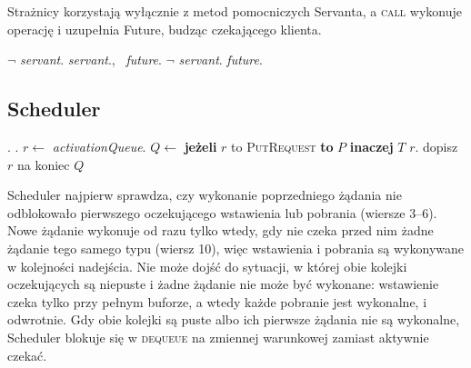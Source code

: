 \documentclass[11pt,a4paper]{article}
\newenvironment{algorytm}[1][htb]
  {\par\bigskip\floatname{algorithm}{}\renewcommand{\thealgorithm}{}
   \begin{algorithm}[#1]%
  }{\end{algorithm}\par\bigskip}
\begin{document}
Strażnicy korzystają wyłącznie z metod pomocniczych Servanta, a \textsc{call} wykonuje operację
i uzupełnia Future, budząc czekającego klienta.

\begin{algorytm}[H]
\begin{algorithmic}[1]
        \State \Return $\lnot$ \textit{servant}.
    \EndProcedure
        \State \textit{servant}., \ \textit{future}.
    \EndProcedure
        \State \Return $\lnot$ \textit{servant}.
    \EndProcedure
        \State \textit{future}.
    \EndProcedure
\end{algorithmic}
\caption{Strażnicy i wykonanie żądań}
\end{algorytm}

\subsection{Scheduler}
\begin{algorytm}[H]
\begin{algorithmic}[1]
     
        \Loop
                \State {}.
                \State {}.
            \Else
                \State $r \gets$ \textit{activationQueue}. 
                \State $Q \gets$ \textbf{jeżeli} $r$ to \textsc{PutRequest} \textbf{to} $P$ \textbf{inaczej} $T$
                    \State $r.$
                \Else
                    \State dopisz $r$ na koniec $Q$
                \EndIf
            \EndIf
        \EndLoop
    \EndProcedure
\end{algorithmic}
\caption{Pętla Schedulera; $P$, $T$ -- kolejki oczekujących wstawień i pobrań}
\end{algorytm}

Scheduler najpierw sprawdza, czy wykonanie poprzedniego żądania nie odblokowało pierwszego
oczekującego wstawienia lub pobrania (wiersze 3--6). Nowe żądanie wykonuje od razu tylko wtedy,
gdy nie czeka przed nim żadne żądanie tego samego typu (wiersz 10), więc wstawienia i pobrania
są wykonywane w kolejności nadejścia. Nie może dojść do sytuacji, w której obie kolejki
oczekujących są niepuste i żadne żądanie nie może być wykonane: wstawienie czeka tylko przy pełnym
buforze, a wtedy każde pobranie jest wykonalne, i odwrotnie. Gdy obie kolejki są puste albo ich
pierwsze żądania nie są wykonalne, Scheduler blokuje się w \textsc{dequeue} na zmiennej warunkowej
zamiast aktywnie czekać.
\end{document}

